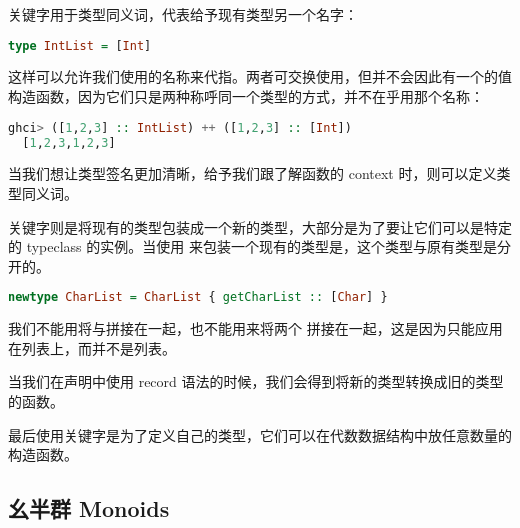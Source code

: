 \documentclass[./main.tex]{subfiles}
\begin{document}
关键字用于类型同义词，代表给予现有类型另一个名字：

\begin{lstlisting}[language=Haskell]
  type IntList = [Int]
\end{lstlisting}

这样可以允许我们使用的名称来代指\acode{[Int]}。两者可交换使用，但并不会因此有一个的值
构造函数，因为它们只是两种称呼同一个类型的方式，并不在乎用那个名称：

\begin{lstlisting}[language=Haskell]
  ghci> ([1,2,3] :: IntList) ++ ([1,2,3] :: [Int])
  [1,2,3,1,2,3]
\end{lstlisting}

当我们想让类型签名更加清晰，给予我们跟了解函数的 context 时，则可以定义类型同义词。

关键字则是将现有的类型包装成一个新的类型，大部分是为了要让它们可以是特定的 typeclass 的实例。当使用
来包装一个现有的类型是，这个类型与原有类型是分开的。

\begin{lstlisting}[language=Haskell]
  newtype CharList = CharList { getCharList :: [Char] }
\end{lstlisting}

我们不能用\acode{++}将与\acode{[Char]}拼接在一起，也不能用\acode{++}来将两个
拼接在一起，这是因为\acode{++}只能应用在列表上，而并不是列表。

当我们在声明中使用 record 语法的时候，我们会得到将新的类型转换成旧的类型的函数。

最后使用关键字是为了定义自己的类型，它们可以在代数数据结构中放任意数量的构造函数。

\subsection*{幺半群 Monoids}



\end{document}
